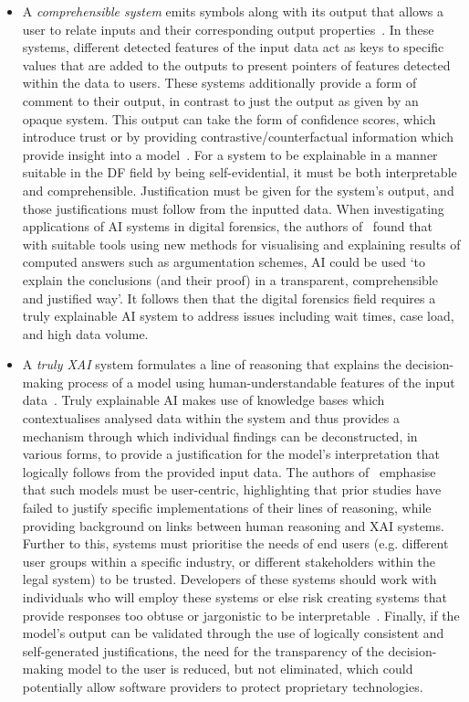 \begin{itemize}
\item A \emph{comprehensible system} emits symbols along with its output that allows a user to relate inputs and their corresponding output properties~\cite{doran17}. In these systems, different detected features of the input data act as keys to specific values that are added to the outputs to present pointers of features detected within the data to users. These systems additionally provide a form of comment to their output, in contrast to just the output as given by an opaque system. This output can take the form of confidence scores, which introduce trust or by providing contrastive/counterfactual information which provide insight into a model~\cite{chari20}. For a system to be explainable in a manner suitable in the DF field by being self-evidential, it must be both interpretable and comprehensible. Justification must be given for the system’s output, and those justifications must follow from the inputted data. When investigating applications of AI systems in digital forensics, the authors of~\cite{Const19} found that with suitable tools using new methods for visualising and explaining results of computed answers such as argumentation schemes, AI could be used `to explain the conclusions (and their proof) in a transparent, comprehensible and justified way'. It follows then that the digital forensics field requires a truly explainable AI system to address issues including wait times, case load, and high data volume.
\item A \emph{truly XAI} system formulates a line of reasoning that explains the decision-making process of a model using human-understandable features of the input data~\cite{doran17}. Truly explainable AI makes use of knowledge bases which contextualises analysed data within the system and thus provides a mechanism through which individual findings can be deconstructed, in various forms, to provide a justification for the model’s interpretation that logically follows from the provided input data. The authors of~\cite{Wang19} emphasise that such models must be user-centric, highlighting that prior studies have failed to justify specific implementations of their lines of reasoning, while providing background on links between human reasoning and XAI systems. Further to this, systems must prioritise the needs of end users (e.g. different user groups within a specific industry, or different stakeholders within the legal system) to be trusted. Developers of these systems should work with individuals who will employ these systems or else risk creating systems that provide responses too obtuse or jargonistic to be interpretable~\cite{Miller17}. Finally, if the model's output can be validated through the use of logically consistent and self-generated justifications, the need for the transparency of the decision-making model to the user is reduced, but not eliminated, which could potentially allow software providers to protect proprietary technologies.
\end{itemize}

